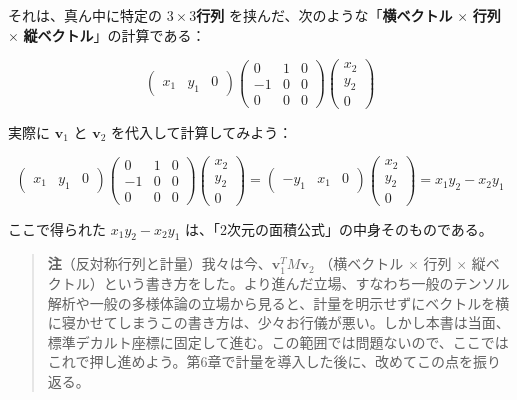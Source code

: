 \documentclass[a4paper,12pt,openany]{book}
\begin{document}
それは、真ん中に特定の \(3 \times 3\)\textbf{行列}
を挟んだ、次のような「\textbf{横ベクトル} \(\times\) \textbf{行列}
\(\times\) \textbf{縦ベクトル}」の計算である：

\[
\begin{pmatrix} x_1 & y_1 & 0 \end{pmatrix}
\begin{pmatrix}
  0 & 1 & 0 \\
  -1 & 0 & 0 \\
  0 & 0 & 0
\end{pmatrix}
\begin{pmatrix} x_2 \\ y_2 \\ 0 \end{pmatrix}
\]

実際に \(\mathbf{v}_1\) と \(\mathbf{v}_2\) を代入して計算してみよう：

\[
\begin{pmatrix} x_1 & y_1 & 0 \end{pmatrix}
\begin{pmatrix}
  0 & 1 & 0 \\
  -1 & 0 & 0 \\
  0 & 0 & 0
\end{pmatrix}
\begin{pmatrix} x_2 \\ y_2 \\ 0 \end{pmatrix}
= \begin{pmatrix} -y_1 & x_1 & 0 \end{pmatrix}
\begin{pmatrix} x_2 \\ y_2 \\ 0 \end{pmatrix}
= x_1 y_2 - x_2 y_1
\]

ここで得られた \(x_1 y_2 - x_2 y_1\)
は、「2次元の面積公式」の中身そのものである。

\begin{quote}
\textbf{注}（反対称行列と計量）我々は今、\(\mathbf{v}_1^T M \mathbf{v}_2\)
（横ベクトル \(\times\) 行列 \(\times\)
縦ベクトル）という書き方をした。より進んだ立場、すなわち一般のテンソル解析や一般の多様体論の立場から見ると、計量を明示せずにベクトルを横に寝かせてしまうこの書き方は、少々お行儀が悪い。しかし本書は当面、標準デカルト座標に固定して進む。この範囲では問題ないので、ここではこれで押し進めよう。第6章で計量を導入した後に、改めてこの点を振り返る。
\end{quote}
\end{document}
